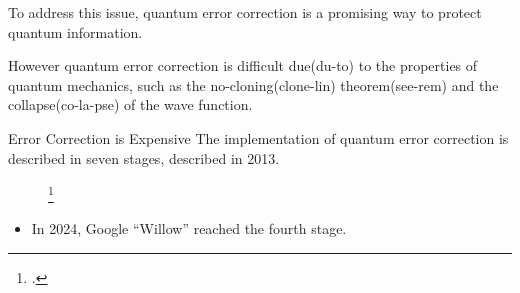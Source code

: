 \documentclass[10pt]{beamer}
\begin{document}
\begin{CJK}{UTF8}{gbsn}
{To address this issue, quantum error correction is a promising way to protect quantum information.

However quantum error correction is difficult due(du-to) to the properties of quantum mechanics, such as the no-cloning(clone-lin) theorem(see-rem) and the collapse(co-la-pse) of the wave function.
}

\begin{frame}[fragile]{Error Correction is Expensive}
 The implementation of quantum error correction is described in seven stages, described in 2013. %
  \begin{figure}
    \footcite{devoret2013superconducting}
  \end{figure}
  \begin{itemize}
    \item In 2024, Google ``Willow'' reached the fourth stage.
  \end{itemize}
\vspace{0.5em}
\end{frame}
\end{CJK}
\end{document}
